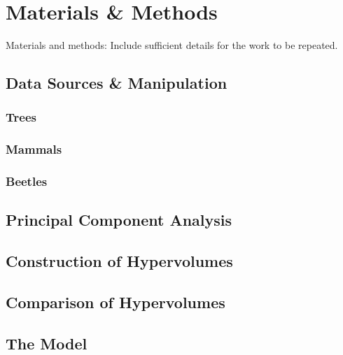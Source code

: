 
\section{Materials \& Methods}


Materials and methods: Include sufficient details for the work to be repeated.

\subsection{Data Sources \& Manipulation}

	\subsubsection*{Trees}
	
	\subsubsection*{Mammals}
	
	\subsubsection*{Beetles}
		
\subsection{Principal Component Analysis}

\subsection{Construction of Hypervolumes}

\subsection{Comparison of Hypervolumes}

\subsection{The Model}